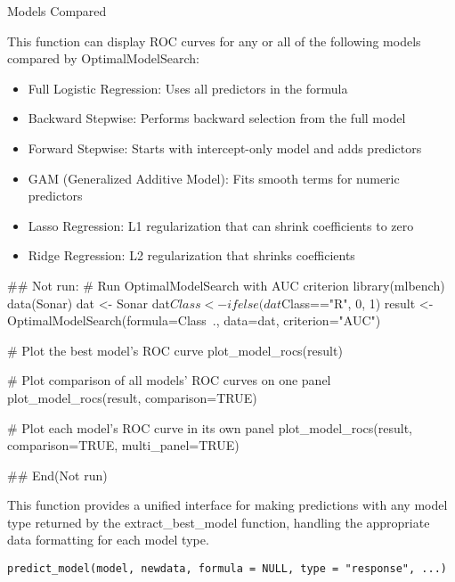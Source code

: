 \documentclass[a4paper]{book}
\begin{document}
\begin{Section}{Models Compared}

This function can display ROC curves for any or all of the following models compared by OptimalModelSearch:
\begin{itemize}

\item{} Full Logistic Regression: Uses all predictors in the formula
\item{} Backward Stepwise: Performs backward selection from the full model
\item{} Forward Stepwise: Starts with intercept-only model and adds predictors
\item{} GAM (Generalized Additive Model): Fits smooth terms for numeric predictors
\item{} Lasso Regression: L1 regularization that can shrink coefficients to zero
\item{} Ridge Regression: L2 regularization that shrinks coefficients

\end{itemize}

\end{Section}
%
\begin{Examples}
\begin{ExampleCode}
## Not run: 
# Run OptimalModelSearch with AUC criterion
library(mlbench)
data(Sonar)
dat <- Sonar
dat$Class <- ifelse(dat$Class=="R", 0, 1)
result <- OptimalModelSearch(formula=Class~., data=dat, criterion="AUC")

# Plot the best model's ROC curve
plot_model_rocs(result)

# Plot comparison of all models' ROC curves on one panel
plot_model_rocs(result, comparison=TRUE)

# Plot each model's ROC curve in its own panel
plot_model_rocs(result, comparison=TRUE, multi_panel=TRUE)

## End(Not run)
\end{ExampleCode}
\end{Examples}
%
\begin{Description}
This function provides a unified interface for making predictions with any
model type returned by the extract\_best\_model function, handling the 
appropriate data formatting for each model type.
\end{Description}
%
\begin{Usage}
\begin{verbatim}
predict_model(model, newdata, formula = NULL, type = "response", ...)
\end{verbatim}
\end{Usage}
\end{document}
